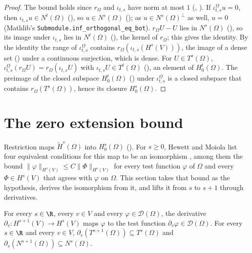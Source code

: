 \begin{proof}
\leanok
The bound holds since $r_\Omega$ and $\iota_{t,s}$ have norm at most $1$
(, ). If
$\iota^\Omega_{t,s} u = 0$, then $\iota_{t,s} u \in N^t(\Omega)$
(), so $u \in N^s(\Omega)$
(); as $u \in N^s(\Omega)^\perp$ as well, $u = 0$ (Mathlib's
\texttt{Submodule.\allowbreak inf\_\allowbreak orthogonal\_\allowbreak eq\_\allowbreak bot}).
$r_\Omega U - U$ lies in $N^s(\Omega)$ (), so its image
under $\iota_{t,s}$ lies in $N^t(\Omega)$ (), the kernel
of $r_\Omega$; this gives the identity. By the identity the range of $\iota^\Omega_{t,s}$ contains
$r_\Omega(\iota_{t,s}(H^s(V)))$, the image of a dense set ()
under a continuous surjection, which is dense. For $U \in T^s(\Omega)$,
$\iota^\Omega_{t,s}(r_\Omega U) = r_\Omega(\iota_{t,s} U)$ with
$\iota_{t,s} U \in T^t(\Omega)$ (), an element of
$H^t_0(\Omega)$. The preimage of the closed subspace $H^t_0(\Omega)$
() under $\iota^\Omega_{t,s}$ is a closed subspace
that contains $r_\Omega(T^s(\Omega))$, hence its closure $H^s_0(\Omega)$.
\end{proof}

\section{The zero extension bound}
\label{sec:zero-extension-bound}

Restriction maps $\tilde H^s(\Omega)$ into $H^s_0(\Omega)$
(). For $s \geq 0$, Hewett and Moiola list four
equivalent conditions for this map to be an isomorphism \cite[list after Lemma 2.9]{HewettMoiola},
among them the bound $\|\varphi\|_{H^s(V)} \leq C \|\Phi\|_{H^s(V)}$ for every test function
$\varphi$ of $\Omega$ and every $\Phi \in H^s(V)$ that agrees with $\varphi$ on $\Omega$. This
section takes that bound as the hypothesis, derives the isomorphism from it, and lifts it from
$s$ to $s + 1$ through derivatives.

\begin{lemma}
\label{lem:derivative-tests}
\leanok
{}
For every $s \in \R$, every $v \in V$ and every $\varphi \in \mathcal D(\Omega)$, the derivative
$\partial_v : H^{s+1}(V) \to H^s(V)$ maps $\varphi$ to the test function
$\partial_v \varphi \in \mathcal D(\Omega)$. For every $s \in \R$ and every $v \in V$,
$\partial_v(T^{s+1}(\Omega)) \subseteq T^s(\Omega)$ and
$\partial_v(N^{s+1}(\Omega)) \subseteq N^s(\Omega)$.
\end{lemma}

